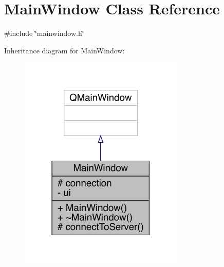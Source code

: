 \hypertarget{a00177}{}\section{Main\+Window Class Reference}
\label{a00177}


{\ttfamily \#include \char`\"{}mainwindow.\+h\char`\"{}}



Inheritance diagram for Main\+Window\+:
\nopagebreak
\begin{figure}[H]
\begin{center}
\leavevmode
\includegraphics[width=222pt]{d5/de9/a00176}
\end{center}
\end{figure}


